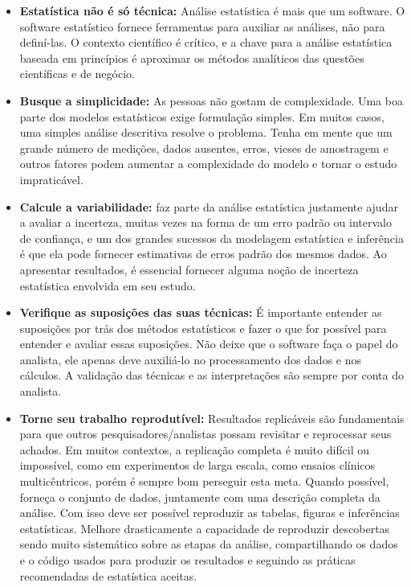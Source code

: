 \documentclass[11pt,]{style/krantz}
\theoremstyle{definition}
\theoremstyle{definition}
\theoremstyle{definition}
\theoremstyle{remark}
\begin{document}
\begin{itemize}
\item
  \textbf{Estatística não é só técnica:} Análise estatística é mais que um software. O software estatístico fornece ferramentas para auxiliar as análises, não para definí-las. O contexto científico é crítico, e a chave para a análise estatística baseada em princípios é aproximar os métodos analíticos das questões científicas e de negócio.
\item
  \textbf{Busque a simplicidade:} As pessoas não gostam de complexidade. Uma boa parte dos modelos estatísticos exige formulação simples. Em muitos casos, uma simples análise descritiva resolve o problema. Tenha em mente que um grande número de medições, dados ausentes, erros, vieses de amostragem e outros fatores podem aumentar a complexidade do modelo e tornar o estudo impraticável.
\item
  \textbf{Calcule a variabilidade:} faz parte da análise estatística justamente ajudar a avaliar a incerteza, muitas vezes na forma de um erro padrão ou intervalo de confiança, e um dos grandes sucessos da modelagem estatística e inferência é que ela pode fornecer estimativas de erros padrão dos mesmos dados. Ao apresentar resultados, é essencial fornecer alguma noção de incerteza estatística envolvida em seu estudo.
\item
  \textbf{Verifique as suposições das suas técnicas:} É importante entender as suposições por trás dos métodos estatísticos e fazer o que for possível para entender e avaliar essas suposições. Não deixe que o software faça o papel do analista, ele apenas deve auxiliá-lo no processamento dos dados e nos cálculos. A validação das técnicas e as interpretações são sempre por conta do analista.
\item
  \textbf{Torne seu trabalho reprodutível:} Resultados replicáveis são fundamentais para que outros pesquisadores/analistas possam revisitar e reprocessar seus achados. Em muitos contextos, a replicação completa é muito difícil ou impossível, como em experimentos de larga escala, como ensaios clínicos multicêntricos, porém é sempre bom perseguir esta meta. Quando possível, forneça o conjunto de dados, juntamente com uma descrição completa da análise. Com isso deve ser possível reproduzir as tabelas, figuras e inferências estatísticas. Melhore drasticamente a capacidade de reproduzir descobertas sendo muito sistemático sobre as etapas da análise, compartilhando os dados e o código usados para produzir os resultados e seguindo as práticas recomendadas de estatística aceitas.
\end{itemize}
\end{document}
